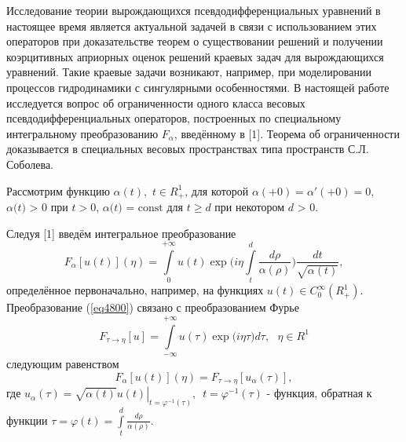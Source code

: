 



\vzmscaption

{\sloppy

Исследование теории вырождающихся псевдодифференциальных уравнений в
настоящее время является актуальной задачей в связи с использованием этих
операторов при доказательстве теорем о существовании решений и получении
коэрцитивных априорных оценок решений краевых задач для вырождающихся
уравнений. Такие краевые задачи возникают, например, при моделировании
процессов гидродинамики с сингулярными особенностями. В настоящей работе
исследуется вопрос об ограниченности одного класса весовых
псевдодифференциальных операторов, построенных по специальному интегральному
преобразованию $F_\alpha $, введённому в [1]. Теорема об ограниченности
доказывается в специальных весовых пространствах типа пространств С.Л.
Соболева.

Рассмотрим функцию $\alpha (t),\,\,t \in R_ + ^1 $, для которой $\alpha ( +
0) = {\alpha }'( + 0) = 0$, $\alpha \mbox{(}t\mbox{) > 0}$ при $t > 0$,
$\alpha \mbox{(}t\mbox{) = const}$ для $t \geqslant d$ при некотором $d\mbox{ >
0}$.

Следуя [1] введём интегральное преобразование
\begin{equation}
\label{eq4800}
F_\alpha [u(t)](\eta ) = \int\limits_0^{ + \infty } {u(t)\exp (i\eta }
\int\limits_t^d {\frac{d\rho }{\alpha (\rho )}} )\frac{dt}{\sqrt {\alpha
(t)} },
\end{equation}
определённое первоначально, например, на функциях $u(t) \in C_0^\infty (R_ +
^1 )$. Преобразование (\ref{eq4800}) связано с преобразованием Фурье
\[
F_{\tau \to \eta } [u] = \int\limits_{ - \infty }^{ + \infty } {u(\tau )\exp
(i\eta } \tau )d\tau ,\,\,\,\,\eta \in R^1
\]
следующим равенством
\[
F_\alpha [u(t)](\eta ) = F_{\tau \to \eta } [u_\alpha (\tau )],
\]
где $u_\alpha (\tau ) = \left. {\sqrt {\alpha (t)} u(t)} \right|_{t =
\varphi ^{ - 1}(\tau )} ,\,\,\,t = \varphi ^{ - 1}(\tau )$ - функция,
обратная к функции $\tau = \varphi (t) = \int\limits_t^d {\frac{d\rho
}{\alpha (\rho )}} .$

}
